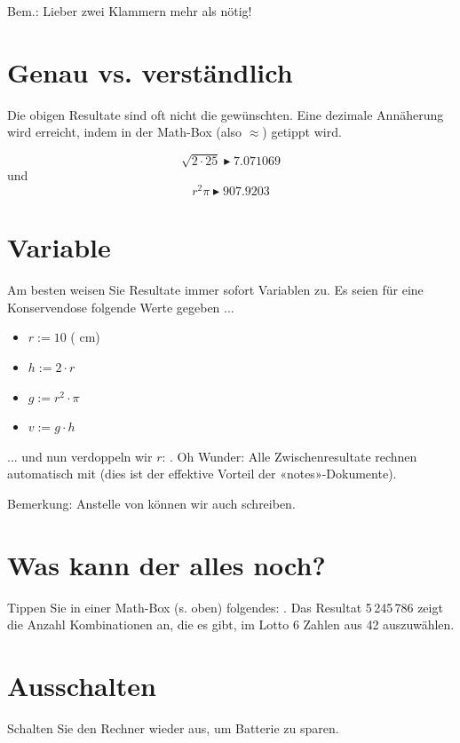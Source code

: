 Bem.: Lieber zwei Klammern mehr als nötig!

\section{Genau vs. verständlich}
Die obigen Resultate sind oft nicht die gewünschten. Eine dezimale
Annäherung wird erreicht, indem in der
Math-Box   (also $\approx$) getippt wird.

$$\sqrt{2\cdot 25} \blacktriangleright 7.071069$$
und
$$r^2\pi \blacktriangleright 907.9203$$

\newpage
\section{Variable}
Am besten weisen Sie Resultate immer sofort Variablen zu.
Es seien für eine Konservendose folgende Werte gegeben ...
\begin{itemize}
  \item $r := 10$ ( cm)
  \item $h := 2\cdot r$
  \item $g := r^2\cdot \pi$
  \item $v := g\cdot h$
\end{itemize}

... und nun verdoppeln wir $r$: . Oh Wunder: Alle
Zwischenresultate rechnen automatisch mit (dies ist der effektive
Vorteil der «notes»-Dokumente). 

Bemerkung: Anstelle von  können wir auch     schreiben.



\section{Was kann der alles noch?}
Tippen Sie in einer Math-Box (s. oben) folgendes:
 .
Das Resultat 5\,245\,786 zeigt die Anzahl Kombinationen an, die es
gibt, im Lotto 6 Zahlen aus 42 auszuwählen.

\section{Ausschalten}
Schalten Sie den Rechner wieder aus, um Batterie zu
sparen.


